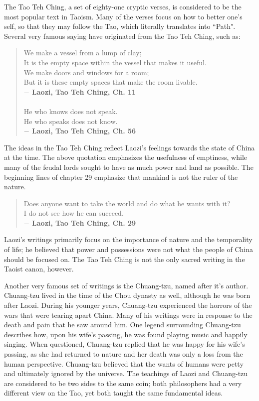 \documentclass[12pt]{hw}
\begin{document}
The Tao Teh Ching, a set of eighty-one cryptic verses, is considered to be the most popular text in Taoism. Many of the verses focus on how to better one's self, so that they may follow the Tao, which literally translates into ``Path". Several very famous saying have originated from the Tao Teh Ching, such as:
\begin{quote}
We make a vessel from a lump of clay;\\
It is the empty space within the vessel that makes it useful.\\
We make doors and windows for a room;\\
But it is these empty spaces that make the room livable.\\
\textbf{$-$ Laozi, Tao Teh Ching, Ch. 11}\\\\
He who knows does not speak.\\
He who speaks does not know.\\
\textbf{$-$ Laozi, Tao Teh Ching, Ch. 56}
\end{quote}
The ideas in the Tao Teh Ching reflect Laozi's feelings towards the state of China at the time. The above quotation emphasizes the usefulness of emptiness, while many of the feudal lords sought to have as much power and land as possible. The beginning lines of chapter 29 emphasize that mankind is not the ruler of the nature.
\begin{quote}
Does anyone want to take the world and do what he wants with it?\\
I do not see how he can succeed.\\
\textbf{$-$ Laozi, Tao Teh Ching, Ch. 29}
\end{quote}
Laozi's writings primarily focus on the importance of nature and the temporality of life; he believed that power and possessions were not what the people of China should be focused on. The Tao Teh Ching is not the only sacred writing in the Taoist canon, however.

Another very famous set of writings is the Chuang-tzu, named after it's author. Chuang-tzu lived in the time of the Chou dynasty as well, although he was born after Laozi. During his younger years, Chuang-tzu experienced the horrors of the wars that were tearing apart China. Many of his writings were in response to the death and pain that he saw around him. One legend surrounding Chuang-tzu describes how, upon his wife's passing, he was found playing music and happily singing. When questioned, Chuang-tzu replied that he was happy for his wife's passing, as she had returned to nature and her death was only a loss from the human perspective. Chuang-tzu believed that the wants of humans were petty and ultimately ignored by the universe. The teachings of Laozi and Chuang-tzu are considered to be two sides to the same coin; both philosophers had a very different view on the Tao, yet both taught the same fundamental ideas.
\end{document}
